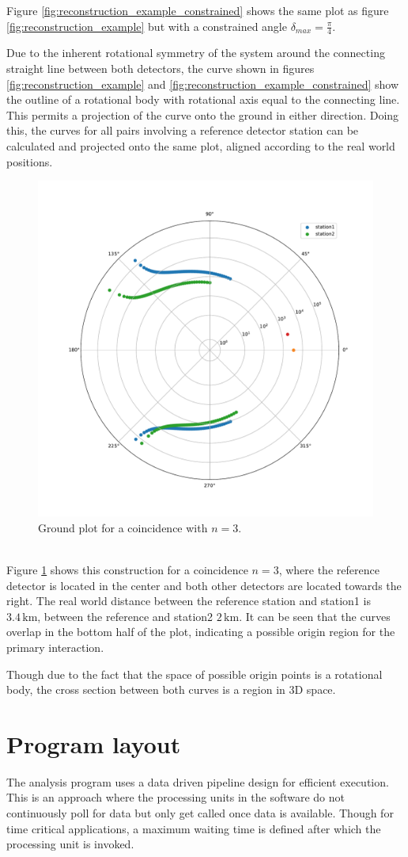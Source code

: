\documentclass[abstract,toc,los,lof,english,10pt,glossary,acronyms]{jluthesis}
\begin{document}
Figure \ref{fig:reconstruction_example_constrained} shows the same plot as figure \ref{fig:reconstruction_example} but with a constrained angle $\delta_{max} = \frac{\pi}{4}$.

Due to the inherent rotational symmetry of the system around the connecting straight line between both detectors, the curve shown in figures \ref{fig:reconstruction_example} and \ref{fig:reconstruction_example_constrained} show the outline of a rotational body with rotational axis equal to the connecting line. This permits a projection of the curve onto the ground in either direction. Doing this, the curves for all pairs involving a reference detector station can be calculated and projected onto the same plot, aligned according to the real world positions.
\begin{figure}[ht!]
	\centering
	\includegraphics[width=0.4\linewidth]{data/example_plot_ground}
	\caption{Ground plot for a coincidence with $n=3$.}
	\label{fig:reconstruction_example_ground}
\end{figure}\\
Figure \ref{fig:reconstruction_example_ground} shows this construction for a coincidence $n=3$, where the reference detector is located in the center and both other detectors are located towards the right. The real world distance between the reference station and station1 is $3.4\,\text{km}$, between the reference and station2 $2\,\text{km}$.
It can be seen that the curves overlap in the bottom half of the plot, indicating a possible origin region for the primary interaction.


Though due to the fact that the space of possible origin points is a rotational body, the cross section between both curves is a region in 3D space.
\section{Program layout}
The analysis program uses a data driven pipeline design for efficient execution. This is an approach where the processing units in the software do not continuously poll for data but only get called once data is available. Though for time critical applications, a maximum waiting time is defined after which the processing unit is invoked.
\end{document}
